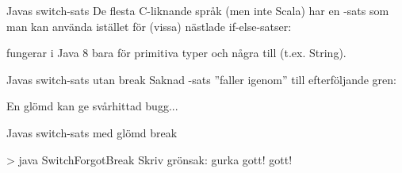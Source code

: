 \begin{Slide}{Javas switch-sats}\SlideFontSmall
De flesta C-liknande språk (men inte Scala) har en -sats som man kan använda istället för (vissa) nästlade if-else-satser:

\vspace{-0.5em} fungerar i Java 8 bara för primitiva typer och några till (t.ex. String).
\end{Slide}




\begin{Slide}{Javas switch-sats utan break}\SlideFontSmall
Saknad -sats ''faller igenom'' till efterföljande gren:

En glömd  kan ge svårhittad bugg...
\end{Slide}

\begin{Slide}{Javas switch-sats med glömd break}\SlideFontSmall

\vspace{-0.5em}

\vspace{-0.7em}\pause
\begin{REPL}
> java SwitchForgotBreak
Skriv grönsak:
gurka
gott!
gott!
\end{REPL}

\end{Slide}


